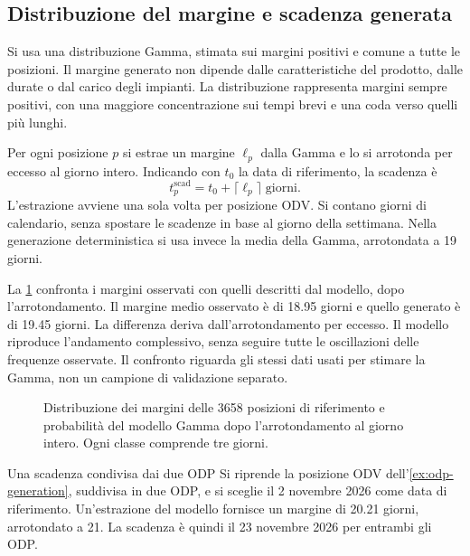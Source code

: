 \subsection{Distribuzione del margine e scadenza generata}
\label{sec:readiness-margin-generation}

Si usa una distribuzione Gamma, stimata sui margini positivi e comune a tutte le posizioni. Il margine generato non dipende dalle caratteristiche del prodotto, dalle durate o dal carico degli impianti. La distribuzione rappresenta margini sempre positivi, con una maggiore concentrazione sui tempi brevi e una coda verso quelli più lunghi.

Per ogni posizione $p$ si estrae un margine $\ell_p$ dalla Gamma e lo si arrotonda per eccesso al giorno intero. Indicando con $t_0$ la data di riferimento, la scadenza è
\begin{equation}
\label{eq:generated-readiness-date}
t_p^{\mathrm{scad}}=t_0+\lceil\ell_p\rceil\;\text{giorni}.
\end{equation}
L'estrazione avviene una sola volta per posizione ODV. Si contano giorni di calendario, senza spostare le scadenze in base al giorno della settimana. Nella generazione deterministica si usa invece la media della Gamma, arrotondata a 19 giorni.

La \cref{fig:readiness-generation-distribution} confronta i margini osservati con quelli descritti dal modello, dopo l'arrotondamento. Il margine medio osservato è di \num{18.95} giorni e quello generato è di \num{19.45} giorni. La differenza deriva dall'arrotondamento per eccesso. Il modello riproduce l'andamento complessivo, senza seguire tutte le oscillazioni delle frequenze osservate. Il confronto riguarda gli stessi dati usati per stimare la Gamma, non un campione di validazione separato.

\begin{figure}[H]
\centering
{}
\caption{Distribuzione dei margini delle \num{3658} posizioni di riferimento e probabilità del modello Gamma dopo l'arrotondamento al giorno intero. Ogni classe comprende tre giorni.}
\label{fig:readiness-generation-distribution}
\end{figure}

\begin{examplebox}{Una scadenza condivisa dai due ODP}
Si riprende la posizione ODV dell'\cref{ex:odp-generation}, suddivisa in due ODP, e si sceglie il 2 novembre 2026 come data di riferimento. Un'estrazione del modello fornisce un margine di \num{20.21} giorni, arrotondato a 21. La scadenza è quindi il 23 novembre 2026 per entrambi gli ODP.
\end{examplebox}

